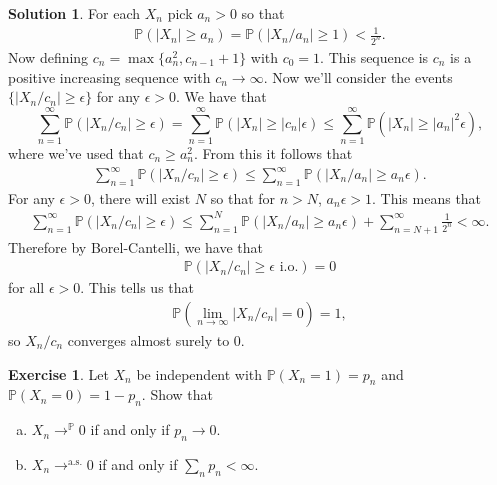 \documentclass[12pt]{article}
\newcommand{\Prob}{\mathbb{P}}
\newcommand{\abs}[1]{ \left| #1 \right| }
\theoremstyle{definition}
\newtheorem{exer}{Exercise}
\newtheorem{sol}{Solution}
\theoremstyle{remark}
\begin{document}
\begin{sol}
For each $X_{n}$ pick $a_{n} > 0$ so that
\begin{align*}
    \Prob( \abs{X_{n}} \geq a_{n} ) = \Prob( \abs{X_{n}/ a_{n}} \geq 1 ) < \frac{1}{2^{n}}.
\end{align*}
Now defining $c_{n} = \max \{a_{n}^{2}, c_{n - 1} + 1 \}$ with $c_{0} = 1$. This sequence is $c_{n}$ is a positive increasing sequence with $c_{n} \to \infty$. Now we'll consider the events $ \{ \abs{X_{n} / c_{n}} \geq \epsilon \}$ for any $\epsilon > 0$. We have that
\begin{equation*}
    \sum_{n = 1}^{\infty} \Prob( \abs{X_{n} / c_{n}} \geq \epsilon ) =  \sum_{n = 1}^{\infty} \Prob( \abs{X_{n}} \geq \abs{c_{n}}\epsilon ) \leq  \sum_{n = 1}^{\infty} \Prob( \abs{X_{n}} \geq \abs{a_{n}}^{2}\epsilon ),
\end{equation*}
where we've used that $c_{n} \geq a_{n}^{2}.$ From this it follows that
\begin{align*}
\sum_{n = 1}^{\infty} \Prob( \abs{X_{n} / c_{n}} \geq \epsilon ) \leq \sum_{n = 1}^{\infty} \Prob( \abs{X_{n} / a_{n}} \geq a_{n} \epsilon ).
\end{align*}
For any $\epsilon > 0$, there will exist $N$ so that for $n > N$,  $a_{n} \epsilon > 1$. This means that 
\begin{align*}
    \sum_{n = 1}^{\infty} \Prob( \abs{X_{n} / c_{n}} \geq \epsilon ) \leq \sum_{n = 1}^{N} \Prob( \abs{X_{n} / a_{n}} \geq a_{n} \epsilon ) + \sum_{n=N+1}^{\infty} \frac{1}{2^{n}} < \infty.
\end{align*}
Therefore by Borel-Cantelli, we have that
\begin{align*}
    \Prob(  \abs{X_{n} / c_{n}} \geq \epsilon \text{ i.o.}) = 0
\end{align*}
for all $\epsilon > 0$. This tells us that
\begin{align*}
    \Prob( \lim_{n\to \infty}\abs{X_{n} / c_{n}} = 0 ) = 1,
\end{align*}
so $X_{n} / c_{n}$ converges almost surely to 0.
\end{sol}

\newpage

\begin{exer}
    Let $X_{n}$ be independent with $\Prob(X_{n} = 1) = p_{n}$ and $\Prob(X_{n} = 0) = 1 - p_{n}$. Show that 
    \begin{enumerate}[a)]
        \item $X_{n} \to^{\Prob} 0$ if and only if $p_{n} \to 0$.
        \item $X_{n} \to^{\text{a.s.}} 0$ if and only if $\sum_{n} p_{n} < \infty$.
    \end{enumerate} 
\end{exer}
\end{document}
